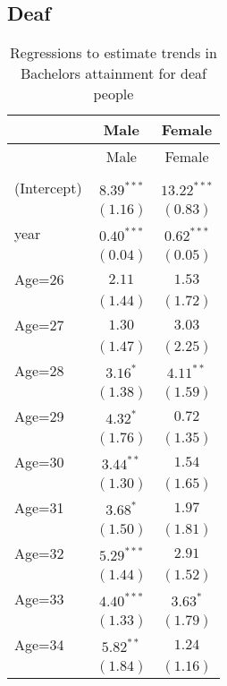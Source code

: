 \documentclass[fullpage]{paper}
\begin{document}
\subsection{ Deaf }

\begin{center}
\begin{longtable}{l c c }
\hline
 & Male & Female \\
\hline
\endfirsthead
\hline
 & Male & Female \\
\hline
\endhead
\hline
\endfoot
\hline
\multicolumn{3}{l}{\scriptsize{$^{***}p<0.001$, $^{**}p<0.01$, $^*p<0.05$}}\\
\caption{Regressions to estimate trends in Bachelors attainment for deaf people}
\label{table:coefficients}
\endlastfoot
(Intercept) & $8.39^{***}$ & $13.22^{***}$ \\
            & $(1.16)$     & $(0.83)$      \\
year        & $0.40^{***}$ & $0.62^{***}$  \\
            & $(0.04)$     & $(0.05)$      \\
Age=26      & $2.11$       & $1.53$        \\
            & $(1.44)$     & $(1.72)$      \\
Age=27      & $1.30$       & $3.03$        \\
            & $(1.47)$     & $(2.25)$      \\
Age=28      & $3.16^{*}$   & $4.11^{**}$   \\
            & $(1.38)$     & $(1.59)$      \\
Age=29      & $4.32^{*}$   & $0.72$        \\
            & $(1.76)$     & $(1.35)$      \\
Age=30      & $3.44^{**}$  & $1.54$        \\
            & $(1.30)$     & $(1.65)$      \\
Age=31      & $3.68^{*}$   & $1.97$        \\
            & $(1.50)$     & $(1.81)$      \\
Age=32      & $5.29^{***}$ & $2.91$        \\
            & $(1.44)$     & $(1.52)$      \\
Age=33      & $4.40^{***}$ & $3.63^{*}$    \\
            & $(1.33)$     & $(1.79)$      \\
Age=34      & $5.82^{**}$  & $1.24$        \\
            & $(1.84)$     & $(1.16)$      \\

\end{longtable}
\end{center}
\end{document}
